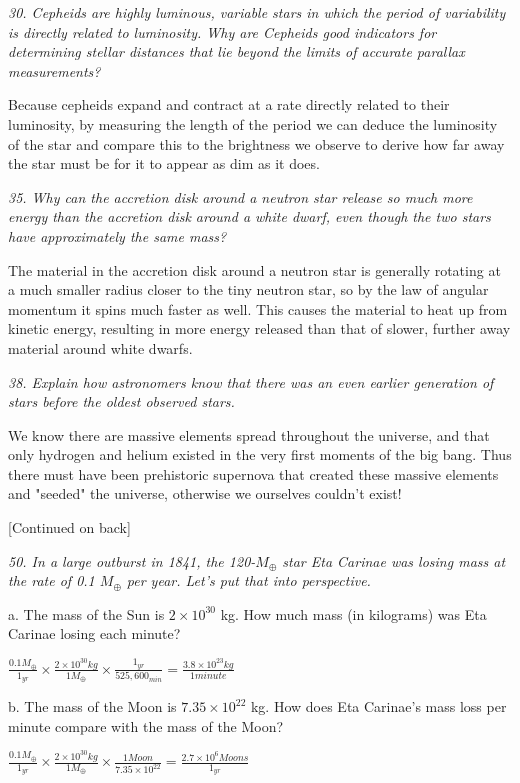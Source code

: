 \documentclass[letterpaper,11pt]{article}
\begin{document}
\bigskip
\it
30. Cepheids are highly luminous, variable stars in which the
period of variability is directly related to luminosity. Why are
Cepheids good indicators for determining stellar distances
that lie beyond the limits of accurate parallax measurements?
\normalfont
\smallskip
\par
Because cepheids expand and contract at a rate directly related to their luminosity, by measuring the length of the period we can deduce the luminosity of the star and compare this to the brightness we observe to derive how far away the star must be for it to appear as dim as it does.

\bigskip
\it
35. Why can the accretion disk around a neutron star release so
much more energy than the accretion disk around a white dwarf,
even though the two stars have approximately the same mass?
\normalfont
\smallskip
\par
The material in the accretion disk around a neutron star is generally rotating at a much smaller radius closer to the tiny neutron star, so by the law of angular momentum it spins much faster as well. This causes the material to heat up from kinetic energy, resulting in more energy released than that of slower, further away material around white dwarfs.

\bigskip
\it
38. Explain how astronomers know that there was an even
earlier generation of stars before the oldest observed stars.
\normalfont
\smallskip
\par
We know there are massive elements spread throughout the universe, and that only hydrogen and helium existed in the very first moments of the big bang. Thus there must have been prehistoric supernova that created these massive elements and "seeded" the universe, otherwise we ourselves couldn't  exist!
\bigskip
\bf
\begin{center}
	
	[Continued on back]
\end{center}

\pagebreak

\it
50. In a large outburst in 1841, the 120-$M_\oplus$ star Eta Carinae was
losing mass at the rate of 0.1 $M_\oplus$ per year. Let’s put that into
perspective.
\par
a. The mass of the Sun is $2 \times 10^{30}$ kg. How much mass (in
kilograms) was Eta Carinae losing each minute?
\normalfont
\medskip
\par
\begin{center}
	$
	\displaystyle
	\frac{0.1M_\oplus}{1_{yr}} 
	\times 
	\frac{2\times10^{30} kg}{1M_\oplus } 
	\times
	\frac{1_{yr}}{525,600_{min}}
	=
	\frac{3.8\times10^{23} kg}{1 minute}
	$
\end{center}

\medskip
\par

b. The mass of the Moon is $7.35 \times 10^{22}$ kg. How does Eta Carinae’s
mass loss per minute compare with the mass of the Moon?
\normalfont
\begin{center}
	$
	\displaystyle
	\frac{0.1M_\oplus}{1_{yr}} 
	\times 
	\frac{2\times10^{30} kg}{1M_\oplus } 
	\times
	\frac{1 Moon}{7.35\times10^{22}}
	=
	\frac{2.7\times10^{6} Moons}{1_{yr}}
	$
\end{center}
	
\end{document}
